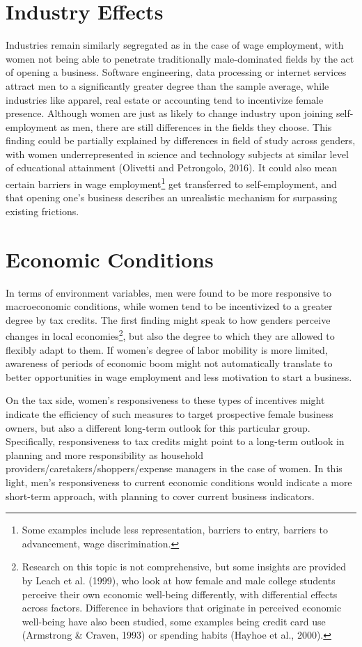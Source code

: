 \section{Industry Effects}
Industries remain similarly segregated as in the case of wage employment, with women not being able to penetrate traditionally male-dominated fields by the act of opening a business. Software engineering, data processing or internet services attract men to a significantly greater degree than the sample average, while industries like apparel, real estate or accounting tend to incentivize female presence. Although women are just as likely to change industry upon joining self-employment as men, there are still differences in the fields they choose. This finding could be partially explained by differences in field of study across genders, with women underrepresented in science and technology subjects at similar level of educational attainment (Olivetti and Petrongolo, 2016). It could also mean certain barriers in wage employment\footnote{Some examples include less representation, barriers to entry, barriers to advancement, wage discrimination.} get transferred to self-employment, and that opening one's business describes an unrealistic mechanism for surpassing existing frictions. 

\section{Economic Conditions}

In terms of environment variables, men were found to be more responsive to macroeconomic conditions, while women tend to be incentivized to a greater degree by tax credits. The first finding might speak to how genders perceive changes in local economies\footnote{Research on this topic is not comprehensive, but some insights are provided by Leach et al. (1999), who look at how female and male college students perceive their own economic well-being differently, with differential effects across factors. Difference in behaviors that originate in perceived economic well-being have also been studied, some examples being credit card use (Armstrong & Craven, 1993) or spending habits (Hayhoe et al., 2000).}, but also the degree to which they are allowed to flexibly adapt to them. If women's degree of labor mobility is more limited, awareness of periods of economic boom might not automatically translate to better opportunities in wage employment and less motivation to start a business. 

On the tax side, women's responsiveness to these types of incentives might indicate the efficiency of such measures to target prospective female business owners, but also a different long-term outlook for this particular group. Specifically, responsiveness to tax credits might point to a long-term outlook in planning and more responsibility as household providers/caretakers/shoppers/expense managers in the case of women. In this light, men's responsiveness to current economic conditions would indicate a more short-term approach, with planning to cover current business indicators. 


